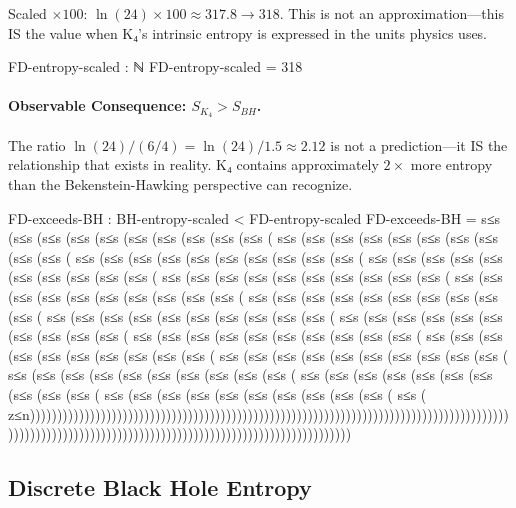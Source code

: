 \documentclass[11pt,a4paper]{book}
\begin{document}
Scaled $\times 100$: $\ln(24) \times 100 \approx 317.8 \to 318$.
This is not an approximation—this IS the value when K₄'s intrinsic entropy is expressed in the units physics uses.

\begin{code}
  FD-entropy-scaled : ℕ
  FD-entropy-scaled = 318

\end{code}

\paragraph{Observable Consequence: $S_{K_4} > S_{BH}$.}
The ratio $\ln(24) / (6/4) = \ln(24) / 1.5 \approx 2.12$ is not a prediction—it IS the relationship that exists in reality. K₄ contains approximately $2\times$ more entropy than the Bekenstein-Hawking perspective can recognize.

\begin{code}
  FD-exceeds-BH : BH-entropy-scaled < FD-entropy-scaled
  FD-exceeds-BH = s≤s (s≤s (s≤s (s≤s (s≤s (s≤s (s≤s (s≤s (s≤s (s≤s (
                  s≤s (s≤s (s≤s (s≤s (s≤s (s≤s (s≤s (s≤s (s≤s (s≤s (
                  s≤s (s≤s (s≤s (s≤s (s≤s (s≤s (s≤s (s≤s (s≤s (s≤s (
                  s≤s (s≤s (s≤s (s≤s (s≤s (s≤s (s≤s (s≤s (s≤s (s≤s (
                  s≤s (s≤s (s≤s (s≤s (s≤s (s≤s (s≤s (s≤s (s≤s (s≤s (
                  s≤s (s≤s (s≤s (s≤s (s≤s (s≤s (s≤s (s≤s (s≤s (s≤s (
                  s≤s (s≤s (s≤s (s≤s (s≤s (s≤s (s≤s (s≤s (s≤s (s≤s (
                  s≤s (s≤s (s≤s (s≤s (s≤s (s≤s (s≤s (s≤s (s≤s (s≤s (
                  s≤s (s≤s (s≤s (s≤s (s≤s (s≤s (s≤s (s≤s (s≤s (s≤s (
                  s≤s (s≤s (s≤s (s≤s (s≤s (s≤s (s≤s (s≤s (s≤s (s≤s (
                  s≤s (s≤s (s≤s (s≤s (s≤s (s≤s (s≤s (s≤s (s≤s (s≤s (
                  s≤s (s≤s (s≤s (s≤s (s≤s (s≤s (s≤s (s≤s (s≤s (s≤s (
                  s≤s (s≤s (s≤s (s≤s (s≤s (s≤s (s≤s (s≤s (s≤s (s≤s (
                  s≤s (s≤s (s≤s (s≤s (s≤s (s≤s (s≤s (s≤s (s≤s (s≤s (
                  s≤s (s≤s (s≤s (s≤s (s≤s (s≤s (s≤s (s≤s (s≤s (s≤s (
                  s≤s (
                  z≤n)))))))))))))))))))))))))))))))))))))))))))))))))))))))))))))))))))))))))))))))))))))))))))))))))))))))))))))))))))))))))))))))))))))))))))))))))))))))
\end{code}

\subsection{Discrete Black Hole Entropy}
\end{document}
